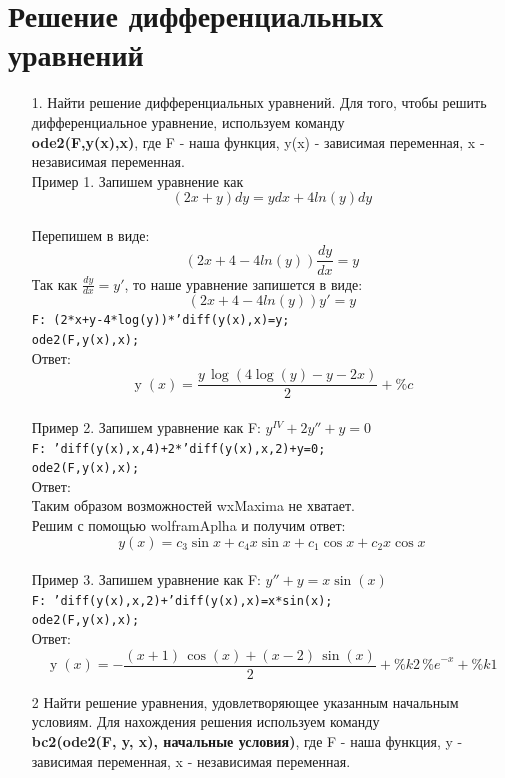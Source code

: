 \documentclass[article, bachelor, och, pract]{SCWorks}
\begin{document}
\newpage
\section{Решение дифференциальных уравнений}
\begin{itemize}
\item[1.] Найти решение дифференциальных уравнений. Для того, чтобы решить дифференциальное уравнение, используем команду\\
\textbf{ode2(F,y(x),x)}, где F - наша функция, y(x) - зависимая переменная, x - независимая переменная.\\

Пример 1. Запишем уравнение как $$(2x+y)dy = ydx +4ln(y)dy$$\\
Перепишем в виде: $$(2x+4-4ln(y))\frac{dy}{dx}=y$$
Так как $\frac{dy}{dx} = y'$, то наше уравнение запишется в виде:
$$(2x+4-4ln(y))y'=y$$
\texttt{F: (2*x+y-4*log(y))*'diff(y(x),x)=y;}\\
\texttt{ode2(F,y(x),x);}\\
Ответ: \[\operatorname{y}(x)=\frac{y\,\log{\left( 4\log{(y)}-y-2x\right) }}{2}+\mathit{\%{}c}\]
\\
Пример 2. Запишем уравнение как F: $y^{IV}+2y''+y=0$\\
\texttt{F: 'diff(y(x),x,4)+2*'diff(y(x),x,2)+y=0;}\\
\texttt{ode2(F,y(x),x);}\\
Ответ: \\
Таким образом возможностей wxMaxima не хватает.\\
Решим с помощью wolframAplha и получим ответ:
$$y(x) = c_3 \sin{x}+c_4 x \sin{x}+c_1 \cos{x}+c_2 x \cos{x}$$\\
Пример 3. Запишем уравнение как F: $y''+y=x\sin(x) $\\
\texttt{F: 'diff(y(x),x,2)+'diff(y(x),x)=x*sin(x);}\\
\texttt{ode2(F,y(x),x);}\\
Ответ: \[\operatorname{y}(x)=-\frac{\left( x+1\right) \,\cos{(x)}+\left( x-2\right) \,\sin{(x)}}{2}+\mathit{\%{}k2}\,{{\%{}e}^{-x}}+\mathit{\%{}k1}\]

\item[2] Найти решение уравнения, удовлетворяющее указанным начальным условиям. Для нахождения решения используем команду \\ \textbf{bc2(ode2(F, y, x), начальные условия)}, где F - наша функция, y - зависимая переменная, x - независимая переменная.


\end{itemize}
\end{document}

